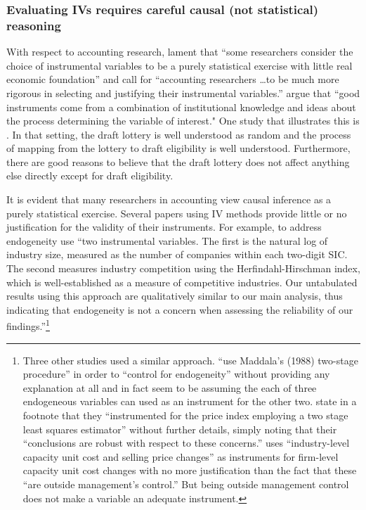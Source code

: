\documentclass[11pt,reqno]{amsart}
\begin{document}
\subsubsection{Evaluating IVs requires careful causal (not statistical) reasoning}

With respect to accounting research, \citet{Larcker:2010fq} lament that ``some researchers consider the choice of instrumental variables to be a purely statistical exercise with little real economic foundation'' and call for 
``accounting researchers \dots to be much more rigorous in selecting and justifying their instrumental variables.'' 
\citet[p.117]{Angrist:2008vk} argue that ``good instruments come from a combination of institutional knowledge and ideas about the process determining the variable of interest."
One study that illustrates this is \citet{Angrist:1990dk}.
In that setting, the draft lottery is well understood as random and the process of mapping from the lottery to draft eligibility is well understood.
Furthermore, there are good reasons to believe that the draft lottery does not affect anything else directly except for draft eligibility.%

It is evident that many researchers in accounting view causal inference as a purely statistical exercise.
Several papers using IV methods  provide little or no justification for the validity of their instruments.
For example, to address endogeneity \citet{Cohen:2014jl} use ``two instrumental variables. The first is the natural log of industry size, measured as the number of companies within each two-digit SIC. The second measures industry competition using the Herfindahl-Hirschman index, which is well-established as a measure of competitive industries. Our untabulated results using this approach are qualitatively similar to our main analysis, thus indicating that endogeneity is not a concern when assessing the reliability of our findings.''\footnote{
Three other studies used a similar approach.
 \citet{Vermeer:2014bs} ``use Maddala's (1988) two-stage procedure'' in order to ``control for endogeneity'' without providing any explanation at all and in fact seem to be assuming the each of three endogeneous variables can used as an instrument for the other two.
\citet[p.48]{Fox:2014io} state in a footnote that they ``instrumented for the price index employing a two stage least squares estimator'' without further details, simply noting that their ``conclusions are robust with respect to these concerns.''
\citet{Cannon:2014im} uses ``industry-level capacity unit cost and selling price changes'' as instruments for firm-level capacity unit cost changes with no more justification than the fact that these ``are outside management's control.'' But being outside management control does not make a variable an adequate instrument.}
\end{document}
